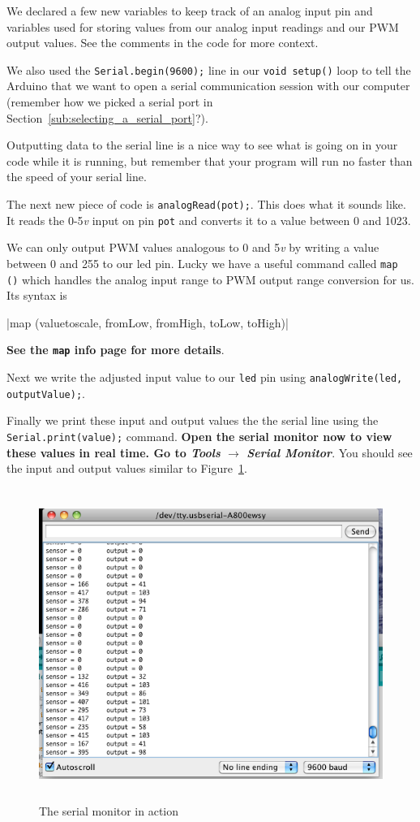 \documentclass[11pt,a4paper]{article}
\begin{document}
We declared a few new variables to keep track of an analog input pin and variables used for storing values from our analog input readings and our PWM output values.  See the comments in the code for more context.  

We also used the 
\texttt{Serial.begin(9600);} line in our \texttt{void setup()} loop to tell the Arduino that we want to open a serial communication session with our computer (remember how we picked a serial port in Section~\ref{sub:selecting_a_serial_port}?).

Outputting data to the serial line is a nice way to see what is going on in your code while it is running, but remember that your program will run no faster than the speed of your serial line.

The next new piece of code is \texttt{analogRead(pot);}.  This does what it sounds like.  It reads the 0-5\emph{v} input on pin \texttt{pot} and converts it to a value between 0 and 1023.

We can only output PWM values analogous to 0 and 5\emph{v} by writing a value between 0 and 255 to our led pin.  Lucky we have a useful command called \texttt{map ()} which handles the analog input range to PWM output range conversion for us.  Its syntax is

|map (valuetoscale, fromLow, fromHigh, toLow, toHigh)|

\textbf{See the \texttt{map} info page for more details}.\cite{map}

Next we write the adjusted input value to our \texttt{led} pin using \texttt{analogWrite(led, outputValue);}. 

Finally we print these input and output values the the serial line using the \texttt{Serial.print(value);} command.  \textbf{Open the serial monitor now to view these values in real time.  Go to \emph{Tools} $\rightarrow$  \emph{Serial Monitor}}.  You should see the input and output values similar to Figure~\ref{fig:figures_serial-mon}.

\begin{figure}[htbp]
    \centering
        \includegraphics[height=4in]{figures/serial-mon.png}
    \caption{The serial monitor in action}
    \label{fig:figures_serial-mon}
\end{figure}
\end{document}
